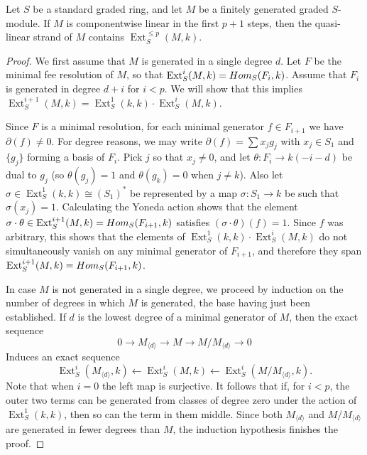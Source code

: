 \documentclass[10pt,a4paper]{amsart}
\DeclareMathOperator{\Ext}{Ext}
\begin{document}
\begin{proposition}\label{prop_qlinstrand}
    Let $S$ be a standard graded ring, and let $M$ be a finitely generated graded $S$-module. If $M$ is componentwise linear in the first $p+1$ steps, then the quasi-linear strand of $M$ contains $\Ext_S^{\leqslant p}(M,k)$.
\end{proposition}

\begin{proof}
We first assume that $M$ is generated in a single degree $d$. Let $F$ be the minimal fee resolution of $M$, so that $\Ext^i_S(M,k)={\rm Hom}_S(F_i,k)$. Assume that $F_i$ is generated in degree $d+i$ for $i< p$. We will show that this implies $\Ext_S^{i+1}(M,k)=\Ext_S^1(k,k)\cdot \Ext_S^i(M,k)$.

Since $F$ is a minimal resolution, for each minimal generator $f\in F_{i+1}$ we have $\partial(f)\neq 0$. For degree reasons, we may write $\partial(f)=\sum x_j g_j$ with $x_j\in S_1$ and $\{g_j\}$ forming a basis of $F_{i}$. Pick $j$ so that $x_j\neq 0$, and let $\theta: F_i\to k(-i-d)$ be dual to $g_j$ (so $\theta(g_j)=1$ and $\theta(g_k)=0$ when $j\neq k$). Also let $\sigma\in \Ext_S^1(k,k)\cong (S_1)^*$ be represented by a map $\sigma \colon S_1\to k$ be such that $\sigma( x_j)=1$. Calculating the Yoneda action shows that the element $\sigma\cdot\theta\in \Ext_S^{i+1}(M,k)={\rm Hom}_S(F_{i+1},k)$ satisfies  $(\sigma\cdot\theta)(f)=1$. Since $f$ was arbitrary, this shows that the elements of $\Ext_S^1(k,k)\cdot \Ext_S^i(M,k)$ do not simultaneously vanish on any minimal generator of $F_{i+1}$, and therefore they span $\Ext_S^{i+1}(M,k)={\rm Hom}_S(F_{i+1},k)$.

In case $M$ is not generated in a single degree, we proceed by induction on the number of degrees in which $M$ is generated, the base having just been established. If $d$ is the lowest degree of a minimal generator of $M$, then the exact sequence
\[
0\to M_{\langle d\rangle}\to M \to M/ M_{\langle d\rangle}\to 0
\]
Induces an exact sequence
\[
\Ext_S^i(M_{\langle d\rangle},k)\leftarrow \Ext_S^i(M,k) \leftarrow \Ext_S^i(M/ M_{\langle d\rangle},k).
\]
Note that when $i=0$ the left map is surjective. 
It follows that if, for $i<p$, the outer two terms can be generated from classes of degree zero under the action of $\Ext^1_S(k,k)$, then so can the term in them middle. Since both $M_{\langle d\rangle}$ and $M/M_{\langle d\rangle}$ are generated in fewer degrees than $M$, the induction hypothesis finishes the proof.
\end{proof}
\end{document}
